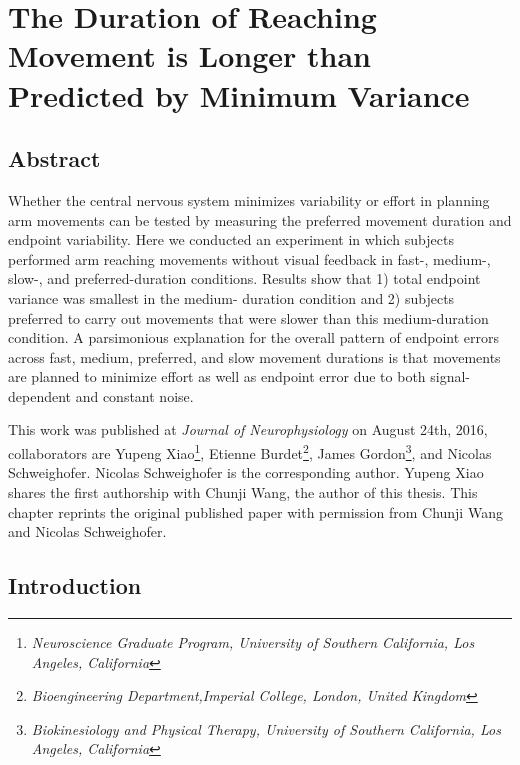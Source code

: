 \chapter{The Duration of Reaching Movement is Longer than Predicted by Minimum Variance}
\label{cha:movementtime}


\section{Abstract}
Whether the central nervous system minimizes variability or effort in planning arm movements can be tested by measuring the preferred movement duration and endpoint variability. Here we conducted an experiment in which subjects performed arm reaching movements without visual feedback in fast-, medium-, slow-, and preferred-duration conditions. Results show that 1) total endpoint variance was smallest in the medium- duration condition and 2) subjects preferred to carry out movements that were slower than this medium-duration condition. A parsimonious explanation for the overall pattern of endpoint errors across fast, medium, preferred, and slow movement durations is that movements are planned to minimize effort as well as endpoint error due to both signal-dependent and constant noise.

This work was published at \textit{Journal of Neurophysiology} on August 24th, 2016, collaborators are Yupeng Xiao\footnote{\textit{Neuroscience Graduate Program, University of Southern California, Los Angeles, California}}, Etienne Burdet\footnote{\textit{Bioengineering Department,Imperial College, London, United Kingdom}}, James Gordon\footnote{\label{bknpt}\textit{Biokinesiology and Physical Therapy, University of Southern California, Los Angeles, California}}, and Nicolas Schweighofer\footnotemark[\ref{bknpt}]. Nicolas Schweighofer is the corresponding author. Yupeng Xiao shares the first authorship with Chunji Wang, the author of this thesis. This chapter reprints the original published paper with permission from Chunji Wang and Nicolas Schweighofer.

\section{Introduction}

